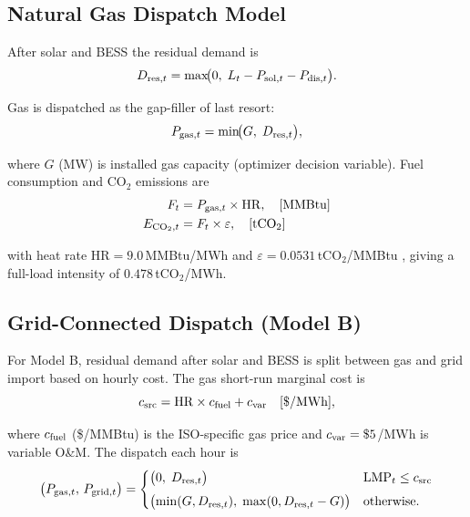\documentclass[conference]{IEEEtran}
\begin{document}
\subsection{Natural Gas Dispatch Model}

After solar and BESS the residual demand is
%
\begin{equation}
  D_{{\rm res},t}
    = \max\!\bigl(0,\;L_t - P_{{\rm sol},t} - P_{{\rm dis},t}\bigr).
  \label{eq:residual}
\end{equation}

Gas is dispatched as the gap-filler of last resort:
%
\begin{equation}
  P_{{\rm gas},t} = \min\!\bigl(G,\;D_{{\rm res},t}\bigr),
  \label{eq:gas}
\end{equation}

\noindent where $G$ (MW) is installed gas capacity (optimizer decision
variable).
Fuel consumption and CO$_2$ emissions are
%
\begin{align}
  F_t &= P_{{\rm gas},t} \times \mathrm{HR}, \quad [\mathrm{MMBtu}] \label{eq:fuel} \\
  E_{{\rm CO}_2,t} &= F_t \times \varepsilon, \quad [\mathrm{tCO}_2] \label{eq:co2}
\end{align}

\noindent with heat rate $\mathrm{HR} = 9.0$\,MMBtu/MWh and
$\varepsilon = 0.0531$\,tCO$_2$/MMBtu \cite{b4}, giving a full-load
intensity of $0.478$\,tCO$_2$/MWh.

\subsection{Grid-Connected Dispatch (Model B)}

For Model B, residual demand after solar and BESS is split between gas and
grid import based on hourly cost.
The gas short-run marginal cost is
%
\begin{equation}
  c_{\rm src} = \mathrm{HR}\times c_{\rm fuel} + c_{\rm var}
  \quad [\$/\mathrm{MWh}],
  \label{eq:gas_src}
\end{equation}

\noindent where $c_{\rm fuel}$ (\$/MMBtu) is the ISO-specific gas price and
$c_{\rm var} = \$5$/MWh is variable O\&M.
The dispatch each hour is
%
\begin{equation}
  \bigl(P_{{\rm gas},t},\,P_{{\rm grid},t}\bigr) =
  \begin{cases}
    \bigl(0,\;D_{{\rm res},t}\bigr)
      & \mathrm{LMP}_t \leq c_{\rm src} \\[4pt]
    \bigl(\min(G,D_{{\rm res},t}),\;\max(0,D_{{\rm res},t}-G)\bigr)
      & \mathrm{otherwise.}
  \end{cases}
  \label{eq:grid_dispatch}
\end{equation}
\end{document}
